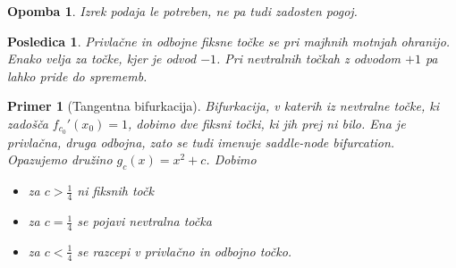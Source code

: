 \documentclass{article}
\newtheorem{posledica}{Posledica}
\newtheorem{opomba}{Opomba}
\newtheorem{primer}{Primer}
\begin{document}
\begin{opomba}
Izrek podaja le potreben, ne pa tudi zadosten pogoj.
\end{opomba}

\begin{posledica}
Privlačne in odbojne fiksne točke se pri majhnih motnjah ohranijo. Enako velja 
za točke, kjer je odvod $-1$. Pri nevtralnih točkah z odvodom $+1$ pa lahko pride 
do sprememb.
\end{posledica}

\begin{primer}[Tangentna bifurkacija]
Bifurkacija, v katerih iz nevtralne točke, ki zadošča $f_{c_0}'(x_0) = 1$, 
dobimo dve fiksni točki, ki jih prej ni bilo. Ena je privlačna, druga odbojna, 
zato se tudi imenuje saddle-node bifurcation. 
Opazujemo družino $g_c(x) = x^2 + c$. Dobimo 
\begin{itemize}
    \item za $c > \frac{1}{4}$ ni fiksnih točk 
    \item za $c = \frac{1}{4}$ se pojavi nevtralna točka 
    \item za $c < \frac{1}{4}$ se razcepi v privlačno in odbojno točko.
\end{itemize}
\end{primer}
\end{document}
